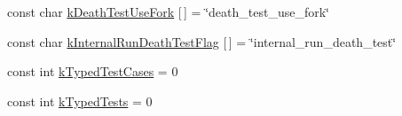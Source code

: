 \begin{DoxyCompactItemize}
\item 
const char \hyperlink{namespacetesting_1_1internal_aefe557a4dfcfd1cb9c7046a26b3c28bb}{k\-Death\-Test\-Use\-Fork} \mbox{[}$\,$\mbox{]} = \char`\"{}death\-\_\-test\-\_\-use\-\_\-fork\char`\"{}
\item 
const char \hyperlink{namespacetesting_1_1internal_abdcf0e0c1b0ec4fbb1e004c3805997d0}{k\-Internal\-Run\-Death\-Test\-Flag} \mbox{[}$\,$\mbox{]} = \char`\"{}internal\-\_\-run\-\_\-death\-\_\-test\char`\"{}
\item 
const int \hyperlink{namespacetesting_1_1internal_a685ea5332074ae63b0ded2b184ac2271}{k\-Typed\-Test\-Cases} = 0
\item 
const int \hyperlink{namespacetesting_1_1internal_a53ee2d113744f9ba1d89469db4d7388b}{k\-Typed\-Tests} = 0
\end{DoxyCompactItemize}


